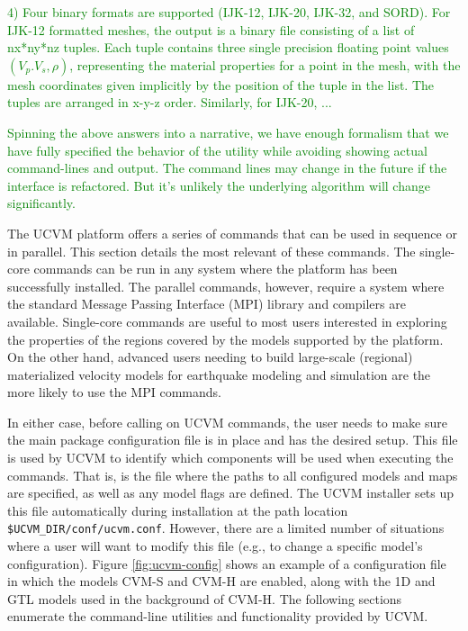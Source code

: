 \textcolor{green}{4) Four binary formats are supported (IJK-12, IJK-20, IJK-32, and SORD). For IJK-12 formatted meshes, the output is a binary file consisting of a list of nx*ny*nz tuples. Each tuple contains three single precision floating point values $(V_p. V_s, \rho)$, representing the material properties for a point in the mesh, with the mesh coordinates given implicitly by the position of the tuple in the list. The tuples are arranged in x-y-z order. Similarly, for IJK-20, ...}

\textcolor{green}{Spinning the above answers into a narrative, we have enough formalism that we have fully specified the behavior of the utility while avoiding showing actual command-lines and output. The command lines may change in the future if the interface is refactored. But it's unlikely the underlying algorithm will change significantly.}

The UCVM platform offers a series of commands that can be used in sequence or in parallel. This section details the most relevant of these commands. The single-core commands can be run in any system where the platform has been successfully installed. The parallel commands, however, require a system where the standard Message Passing Interface (MPI) library and compilers are available. Single-core commands are useful to most users interested in exploring the properties of the regions covered by the models supported by the platform. On the other hand, advanced users needing to build large-scale (regional) materialized velocity models for earthquake modeling and simulation are the more likely to use the MPI commands. 

In either case, before calling on UCVM commands, the user needs to make sure the main package configuration file is in place and has the desired setup. This file is used by UCVM to identify which components will be used when executing the commands. That is, is the file where the paths to all configured models and maps are specified, as well as any model flags are defined. The UCVM installer sets up this file automatically during installation at the path location \texttt{\$UCVM\_DIR/conf/ucvm.conf}. However, there are a limited number of situations where a user will want to modify this file (e.g., to change a specific model's configuration). Figure \ref{fig:ucvm-config} shows an example of a configuration file in which the models CVM-S and CVM-H are enabled, along with the 1D and GTL models used in the background of CVM-H. The following sections enumerate the command-line utilities and functionality provided by UCVM.

